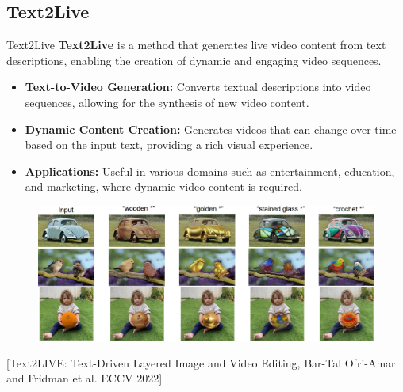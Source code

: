 \subsection{Text2Live}
\begin{frame}[allowframebreaks]{Text2Live}
    \textbf{Text2Live} is a method that generates live video content from text descriptions, enabling the creation of dynamic and engaging video sequences.

    \begin{itemize}
        \item \textbf{Text-to-Video Generation:} Converts textual descriptions into video sequences, allowing for the synthesis of new video content.
        \item \textbf{Dynamic Content Creation:} Generates videos that can change over time based on the input text, providing a rich visual experience.
        \item \textbf{Applications:} Useful in various domains such as entertainment, education, and marketing, where dynamic video content is required.
    \end{itemize}
\framebreak
    \begin{figure}
        \centering
        \includegraphics[width=1\textwidth,height=0.8\textheight,keepaspectratio]{images/video/slide_68_1_img.jpg}
    \end{figure}
    {\footnotesize{[Text2LIVE: Text-Driven Layered Image and Video Editing, Bar-Tal Ofri-Amar and Fridman et al. ECCV 2022]}}
\end{frame}